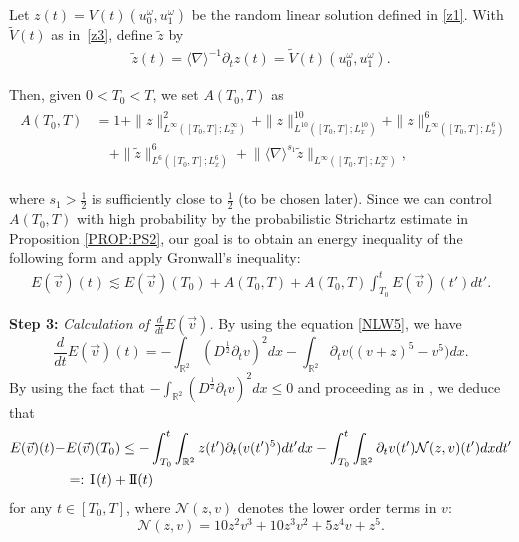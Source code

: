 \documentclass[letterpaper, 11pt,  reqno]{amsart}
\newcommand{\1}{\hspace{0.5mm}\text{I}\hspace{0.2mm}}
\newcommand{\II}{\text{I \hspace{-2.8mm} I} }
\newcommand{\noi}{\noindent}
\newcommand{\R}{\mathbb{R}}
\newcommand{\nb}{\nabla}
\newcommand{\wt}{\widetilde}
\newcommand{\dt}{\partial_t}
\renewcommand{\o}{\omega}
\newcommand{\les}{\lesssim}
\newcommand{\jb}[1]
{\langle #1 \rangle}
\newcommand{\NN}{\mathcal{N}}
\numberwithin{equation}{section}
\numberwithin{theorem}{section}
\begin{document}

Let $z(t) = V(t) (u_0^\o, u_1^\o)$ be the random linear solution defined in  \eqref{z1}.
With $\wt V(t)$ as in~\eqref{z3}, define $\wt z$ by 
\begin{align}
\wt z (t) = \jb{\nb}^{-1} \dt z(t) 
= \wt V(t) (u_0^\o, u_1^\o).
\label{z2}
\end{align}



\noi
Then, 
given $0 < T_0 < T$, we set $A(T_0, T)$ as
\begin{align}
\begin{split}
A(T_0, T) 
& = 1 + \|z \|^2_{L^\infty([T_0, T];L^\infty_x)} 
+ 
 \|z \|^{10}_{L^{10}([T_0, T]; L^{10}_x )}
 + \|z\|_{L^\infty([T_0, T];  L^6_x)}^6 \\
& \quad  + \|\wt z \|_{L^6([T_0, T]; L^6_x)}^6
+ \big\|\jb{\nb}^{s_1}  \wt z\big\|_{L^\infty([T_0, T]; L^\infty_x)}, 
\end{split}
\label{E1a}
\end{align}


\noi
where $s_1 > \frac 12$ is sufficiently close to $\frac 12$ 
(to be chosen later). Since we can control $A(T_{0}, T)$ with high probability by the probabilistic Strichartz estimate in Proposition \ref{PROP:PS2}, our goal is to obtain an energy inequality of the following form and apply Gronwall's inequality:
\begin{align}\label{energycontrol}
 E(\vec v)(t)
\les E(\vec v)(T_0) + A(T_0, T) + A(T_0, T) \int_{T_0}^t E(\vec v)(t') dt'.
\end{align}



\textbf{Step 3:} \textit{Calculation of $\frac{d}{dt}E(\vec v)$.} By using the equation \eqref{NLW5}, we have
\begin{equation}
\frac{d}{dt} E(\vec v)(t) =- \int_{\R^2}(D^\frac{1}{2}\dt v)^2  dx
- \int_{\R^2}\dt v  \big((v+z)^5  - v^5\big) dx.
\label{E1b}
\end{equation}
By using the fact that $- \int_{\R^2}(D^\frac{1}{2}\dt v)^2  dx \le 0$ and proceeding as in \cite{OP}, we deduce that
\begin{align}
\begin{split}
E( \vec v)(t) - 
&  E(\vec v)(T_0)
 \leq 
- 
\int_{T_0}^t
\int_{\R^2}  z (t') \dt ( v(t') ^5) dt' dx
- \int_{T_0}^t\int_{\R^2}
\dt v(t') \mathcal N(z, v)(t')  dx dt' \\
& =:\1(t) +\II(t)
\end{split}
 \label{E1}
\end{align}
for any $t \in [T_0, T]$, where $\NN(z, v)$ denotes the lower order terms in $v$:
\[\NN(z, v) = 10 z^2 v^3 + 10 z^3 v^2 + 5 z^4 v + z^5.\]
\end{document}
